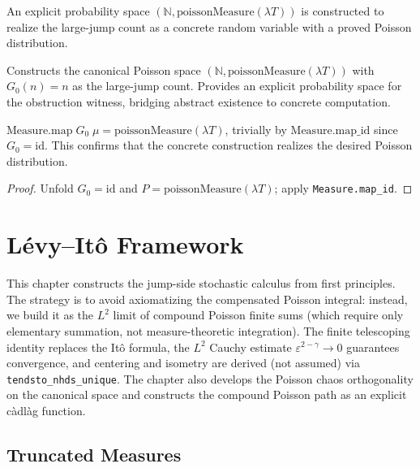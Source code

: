 An explicit probability space $(\mathbb{N}, \mathrm{poissonMeasure}(\lambda T))$ is constructed to realize the large-jump count as a concrete random variable with a proved Poisson distribution.

\begin{defn}\label{def:concrete_jump}
\leanok
{}
Constructs the canonical Poisson space $(\mathbb{N}, \mathrm{poissonMeasure}(\lambda T))$
with $G_0(n) = n$ as the large-jump count. Provides an explicit probability space
for the obstruction witness, bridging abstract existence to concrete computation.
\end{defn}

\begin{theorem}\label{thm:G0_poisson}
\leanok
{}
$\mathrm{Measure.map}\;G_0\;\mu = \mathrm{poissonMeasure}(\lambda T)$,
trivially by $\mathrm{Measure.map\_id}$ since $G_0 = \mathrm{id}$.
This confirms that the concrete construction realizes the desired Poisson distribution.
\end{theorem}
\begin{proof}\leanok Unfold $G_0 = \mathrm{id}$ and $P = \mathrm{poissonMeasure}(\lambda T)$; apply \texttt{Measure.map\_id}.\end{proof}


\chapter{Lévy--Itô Framework}

This chapter constructs the jump-side stochastic calculus from first principles.
The strategy is to avoid axiomatizing the compensated Poisson integral: instead,
we build it as the $L^2$ limit of compound Poisson finite sums (which require
only elementary summation, not measure-theoretic integration). The finite
telescoping identity replaces the It\^o formula, the $L^2$ Cauchy estimate
$\varepsilon^{2-\gamma} \to 0$ guarantees convergence, and centering and isometry
are derived (not assumed) via \texttt{tendsto\_nhds\_unique}. The chapter also
develops the Poisson chaos orthogonality on the canonical space and constructs
the compound Poisson path as an explicit c\`adl\`ag function.

\section{Truncated Measures}

